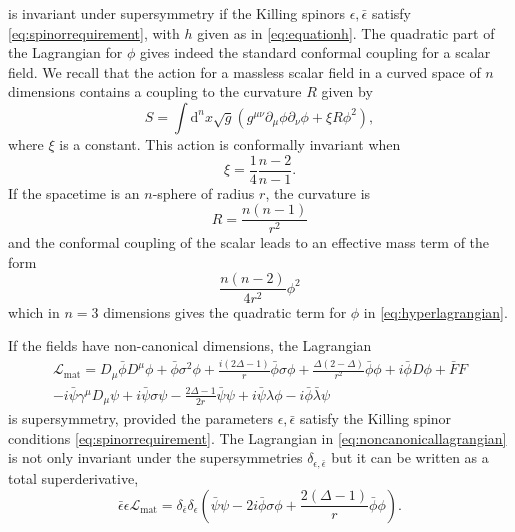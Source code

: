 is invariant under supersymmetry if the Killing spinors
$\epsilon,\bar{\epsilon}$ satisfy \eqref{eq:spinorrequirement}, with $h$ given
as in \eqref{eq:equationh}. The quadratic part of the Lagrangian for $\phi$
gives indeed the standard conformal coupling for  a scalar field. We recall
that the action for a massless scalar field in a curved space of $n$ dimensions
contains a coupling to the curvature $R$ given by
\begin{equation}
  S = \int \mathrm{d}^n x\sqrt{g}(g^{\mu\nu}\partial_\mu\phi\partial_\nu\phi
  + \xi R\phi^2),
\end{equation}
where $\xi$ is a constant. This action is conformally invariant when
\begin{equation}
\xi = \frac{1}{4}\frac{n-2}{n-1}.
\end{equation}
If the  spacetime is an $n$-sphere of radius $r$, the curvature is
\begin{equation}
  R = \frac{n(n-1)}{r^2}
\end{equation}
and the conformal coupling of the scalar leads to an effective mass
term of the form
\begin{equation}
  \frac{n(n-2)}{4r^2}\phi^2
\end{equation}
which in $n=3$ dimensions gives the quadratic term for $\phi$ in
\eqref{eq:hyperlagrangian}. 
\par If the fields have non-canonical dimensions, the Lagrangian
\begin{multline}
  \mathcal{L_\mathrm{mat}} = D_\mu\bar{\phi} D^\mu\phi + \bar{\phi}\sigma^2\phi
  + \frac{i(2\Delta-1)}{r}\bar{\phi}\sigma\phi
  + \frac{\Delta(2-\Delta)}{r^2}\bar{\phi}\phi + i\bar{\phi}D\phi + \bar{F}F\\
  -i\bar{\psi}\gamma^\mu D_\mu \psi + i\bar{\psi}\sigma\psi - \frac{2\Delta
  - 1}{2r}\bar{\psi}\psi + i\bar{\psi}\lambda\phi
  - i\bar{\phi}\bar{\lambda}\psi
  \label{eq:noncanonicallagrangian}
\end{multline}
is supersymmetry, provided the parameters $\epsilon,\bar{\epsilon}$ satisfy the
Killing spinor  conditions \eqref{eq:spinorrequirement}. The Lagrangian in
\eqref{eq:noncanonicallagrangian} is not only invariant under the
supersymmetries $\delta_{\epsilon,\bar{\epsilon}}$ but it can be written as
a total superderivative,
\begin{equation}
  \bar{\epsilon}\epsilon\mathcal{L_\mathrm{mat}}
  = \delta_{\bar{\epsilon}}\delta_{\epsilon}\left(\bar{\psi}\psi
    - 2i\bar{\phi}\sigma\phi + \frac{2(\Delta -1)}{r}\bar{\phi}\phi\right).
  \end{equation}
